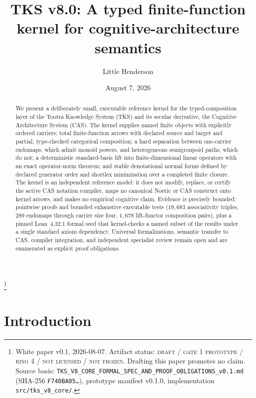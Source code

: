 \documentclass[11pt]{amsart}
\theoremstyle{definition}
\theoremstyle{remark}
\begin{document}
\title[TKS v8.0: A typed finite-function kernel]{TKS v8.0: A typed finite-function kernel for cognitive-architecture semantics}
\author{Little Henderson}
\thanks{White paper v0.1, 2026-08-07. Artifact status: \textsc{draft / gate 1 prototype / ring 4 / not licensed / not frozen}. Drafting this paper promotes no claim. Source basis: \texttt{TKS\_V8\_CORE\_FORMAL\_SPEC\_AND\_PROOF\_OBLIGATIONS\_v0.1.md} (SHA-256 \texttt{F740BA05\ldots}), prototype manifest v0.1.0, implementation \texttt{src/tks\_v8\_core/}.}
\date{August 7, 2026}

\begin{abstract}
We present a deliberately small, executable reference kernel for the typed-composition layer of the Tootra Knowledge System (TKS) and its secular derivative, the Cognitive Architecture System (CAS). The kernel supplies named finite objects with explicitly ordered carriers; total finite-function arrows with declared source and target and partial, type-checked categorical composition; a hard separation between one-carrier endomaps, which admit monoid powers, and heterogeneous semigroupoid paths, which do not; a deterministic standard-basis lift into finite-dimensional linear operators with an exact operator-norm theorem; and stable denotational normal forms defined by declared generator order and shortlex minimization over a completed finite closure. The kernel is an independent reference model: it does not modify, replace, or certify the active CAS notation compiler, maps no canonical Noetic or CAS construct onto kernel arrows, and makes no empirical cognitive claim. Evidence is precisely bounded: pointwise proofs and bounded exhaustive executable tests ($19{,}683$ associativity triples, $289$ endomaps through carrier size four, $1{,}678$ lift-functor composition pairs), plus a pinned Lean~4.32.1 formal seed that kernel-checks a named subset of the results under a single standard axiom dependency. Universal formalizations, semantic transfer to CAS, compiler integration, and independent specialist review remain open and are enumerated as explicit proof obligations.
\end{abstract}

\maketitle

\section{Introduction}
\end{document}
